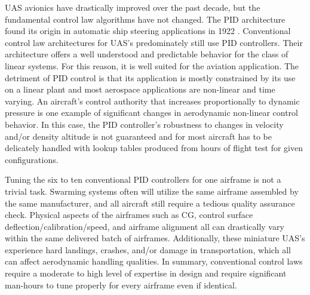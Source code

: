 \ac{UAS} avionics have drastically improved over the past decade, but the fundamental control law algorithms have not changed.  The \ac{PID} architecture found its origin in automatic ship steering applications in 1922 \cite{minorsky1922pid}.  Conventional control law architectures for \ac{UAS}'s predominately still use \ac{PID} controllers.  Their architecture offers a well understood and predictable behavior for the class of linear systems.  For this reason, it is well suited for the aviation application.  The detriment of \ac{PID} control is that its application is mostly constrained by its use on a linear plant and most aerospace applications are non-linear and time varying.   An aircraft's control authority that increases proportionally to dynamic pressure is one example of significant changes in aerodynamic non-linear control behavior.  In this case, the \ac{PID} controller's robustness to changes in velocity and/or density altitude is not guaranteed and for most aircraft has to be delicately handled with lookup tables produced from hours of flight test for given configurations.

Tuning the six to ten conventional \ac{PID} controllers for one airframe is not a trivial task.  Swarming systems often will utilize the same airframe assembled by the same manufacturer, and all aircraft still require a tedious quality assurance check.  Physical aspects of the airframes such as \ac{CG}, control surface deflection/calibration/speed, and airframe alignment all can drastically vary within the same delivered batch of airframes.  Additionally, these miniature \ac{UAS}'s experience hard landings, crashes, and/or damage in transportation, which all can affect aerodynamic handling qualities.  In summary, conventional control laws require a moderate to high level of expertise in design and require significant man-hours to tune properly for every airframe even if identical.  









